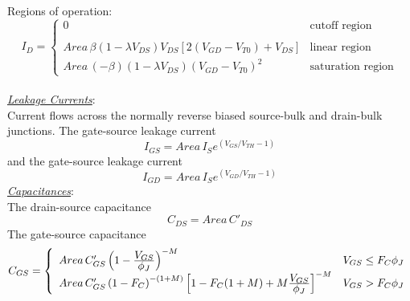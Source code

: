 \\[0.2in]
Regions of operation:
\newline
{}\\[0.1in]
\begin{equation}
I_{D} = \left\{ \begin{array}{ll}
      0  & \mbox{cutoff region} \\ \\
      Area\,\beta \left(1 - \lambda V_{DS}\right)V_{DS}
      \left[2\left(V_{GD}-V_{T0}\right)+V_{DS}\right]
         &\mbox{linear region}\\
      Area\,(-\beta) \left(1 - \lambda V_{DS}\right)
      \left(V_{GD}-V_{T0}\right)^2
         &\mbox{saturation region} \end{array} \right. %
\end{equation}\\[0.2in]
\noindent\textit{\underline{\large Leakage Currents}}:\\[0.1in]
Current flows across the normally reverse biased source-bulk and
drain-bulk junctions. The gate-source leakage current
\begin{equation}
I_{GS} = Area\,I_{S}e^{(\textstyle V_{GS}/V_{TH} -1)}
\end{equation}
and the gate-source leakage current
\begin{equation}
I_{GD} = Area\,I_{S}e^{(\textstyle V_{GD}/V_{TH} -1)}
\end{equation}
\newline
\textit{\underline{\large Capacitances}}:\\[0.1in]
The drain-source capacitance
\begin{equation}
C_{DS} = Area\,C'_{DS}
\end{equation}
The gate-source capacitance
\begin{equation}
C_{GS} = \left\{ \begin{array}{ll}
         Area\,C'_{GS}\left(1 - {{\textstyle V_{GS}}\over{\textstyle \phi_J}}
         \right)^{-M}
         & V_{GS} \le F_C \phi_J\\
         Area\,C'_{GS}\left(1 -F_C\right)^{-(1+M)}
         \left[1-F_C(1+M)+M {{\textstyle V_{GS}}\over{\textstyle \phi_J}}
         \right]^{-M}
         & V_{GS} > F_C \phi_J
         \end{array} \right. %
\end{equation}

